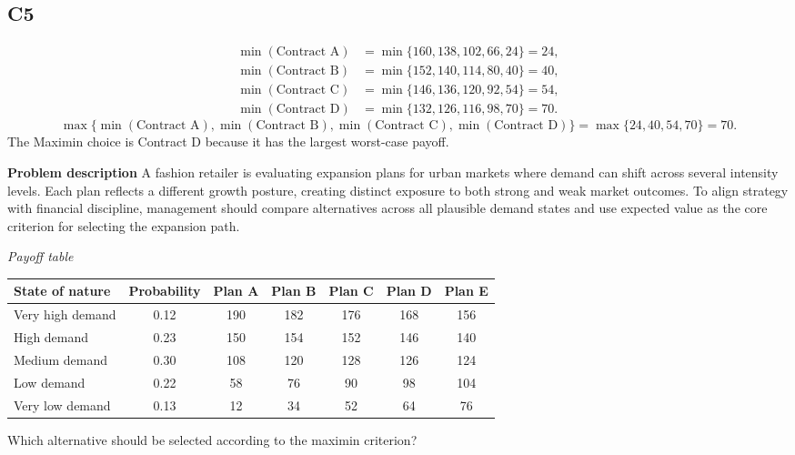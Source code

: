 \begin{ExamProblems}
		\subsection*{C5}
			\[
			\begin{aligned}
			\min(\text{Contract A}) &= \min\{160,138,102,66,24\} = 24,\\
			\min(\text{Contract B}) &= \min\{152,140,114,80,40\} = 40,\\
			\min(\text{Contract C}) &= \min\{146,136,120,92,54\} = 54,\\
			\min(\text{Contract D}) &= \min\{132,126,116,98,70\} = 70.
			\end{aligned}
			\]
			\[
			\max\{\min(\text{Contract A}), \min(\text{Contract B}), \min(\text{Contract C}), \min(\text{Contract D})\}
			= \max\{24, 40, 54, 70\}
			= 70.
			\]
			The Maximin choice is Contract D because it has the largest worst-case payoff.
		\item
		\textbf{Problem description}
		A fashion retailer is evaluating expansion plans for urban markets where demand can shift across several intensity levels. Each plan reflects a different growth posture, creating distinct exposure to both strong and weak market outcomes. To align strategy with financial discipline, management should compare alternatives across all plausible demand states and use expected value as the core criterion for selecting the expansion path.

		\begin{center}
			\textit{Payoff table} \par
			\begin{tabular}{l c c c c c c}
				\toprule
				State of nature & Probability & Plan A & Plan B & Plan C & Plan D & Plan E \\
				\midrule
				Very high demand & 0.12 & 190 & 182 & 176 & 168 & 156 \\
				High demand & 0.23 & 150 & 154 & 152 & 146 & 140 \\
				Medium demand & 0.30 & 108 & 120 & 128 & 126 & 124 \\
				Low demand & 0.22 & 58 & 76 & 90 & 98 & 104 \\
				Very low demand & 0.13 & 12 & 34 & 52 & 64 & 76 \\
				\bottomrule
			\end{tabular}
		\end{center}

		Which alternative should be selected according to the maximin criterion?


\end{ExamProblems}
